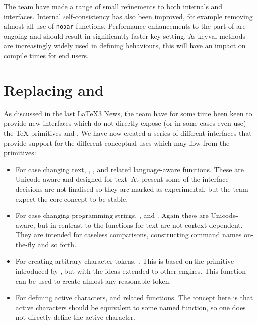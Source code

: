 \documentclass{ltnews}
\begin{document}
The team have made a range of small refinements to both internals and
 interfaces. Internal self-consistency has also been improved, for
example removing almost all use of \texttt{nopar} functions. Performance
enhancements to the  part of  are ongoing and should
result in significantly faster key setting. As keyval methods are increasingly
widely used in defining behaviours, this will have an impact on compile times
for end users.

\section{Replacing  and }

As discussed in the last \LaTeX3 News, the team have for some time been keen
to provide new interfaces which do not directly expose (or in some cases
even use) the \TeX{} primitives  and . We have
now created a series of different interfaces that provide support for the
different conceptual uses which may flow from the primitives:
\begin{itemize}
  \item For case changing text, , ,
     and related language-aware functions. These are
    Unicode-aware and designed for text. At present some of the interface
    decisions are not finalised so they are marked as experimental, but the team
    expect the core concept to be stable.
  \item For case changing programming strings, ,
     and . Again these are
    Unicode-aware, but in contrast to the functions for text are not
    context-dependent. They are intended for caseless comparisons, constructing
    command names on-the-fly and so forth.
  \item For creating arbitrary character tokens, . This
    is based on the  primitive introduced by , but
    with the ideas extended to other engines. This function can be used to
    create almost any reasonable token.
  \item For defining active characters,  and
    related functions. The concept here is that active characters should be
    equivalent to some named function, so one does not directly define the
    active character.
\end{itemize}
\end{document}

